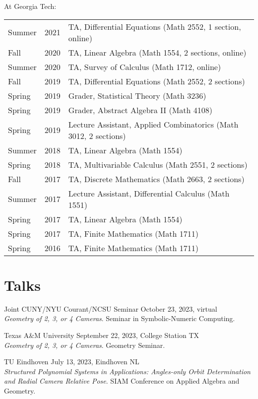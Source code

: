 \documentclass[margin,line,pifont,palatino,courier]{res}
\begin{document}
\begin{resume}
At Georgia Tech:

\begin{tabular}{@{}p{0.4in}p{0.3in}p{4in}}
  Summer   & 2021 & TA, Differential Equations (Math 2552, 1 section, online)\\
  Fall   & 2020 & TA, Linear Algebra (Math 1554, 2 sections, online)\\
  Summer & 2020 & TA, Survey of Calculus (Math 1712, online)\\
  Fall   & 2019  & TA, Differential Equations (Math 2552, 2 sections)\\
  Spring &  2019 & Grader, Statistical Theory (Math 3236)\\
  Spring & 2019 & Grader, Abstract Algebra II (Math 4108)\\
  Spring & 2019 & Lecture Assistant, Applied Combinatorics (Math 3012, 2 sections)\\
  Summer & 2018 & TA, Linear Algebra (Math 1554)\\
  Spring & 2018 & TA, Multivariable Calculus (Math 2551, 2 sections)\\
  Fall & 2017 & TA,  Discrete Mathematics (Math 2663, 2 sections)\\
  Summer & 2017 & Lecture Assistant, Differential Calculus (Math 1551)\\
  Spring & 2017 & TA, Linear Algebra (Math 1554)\\
  Spring & 2017 & TA, Finite Mathematics (Math 1711)\\
  Spring & 2016 & TA, Finite Mathematics (Math 1711)
\end{tabular}
  

    
\section{\sc Talks}    

\par Joint CUNY/NYU Courant/NCSU Seminar
\hfill October 23, 2023, virtual\\
\textit{Geometry of 2, 3, or 4 Cameras}. Seminar in Symbolic-Numeric Computing.

\par Texas A\&M University  \hfill September 22, 2023, College Station
TX\\
\textit{Geometry of 2, 3, or 4 Cameras}. Geometry Seminar.

\par TU Eindhoven  \hfill July 13, 2023, Eindhoven NL\\
\textit{Structured Polynomial Systems in Applications: Angles-only Orbit Determination and Radial Camera Relative Pose}. SIAM Conference on Applied Algebra and Geometry.


\end{resume}
\end{document}

